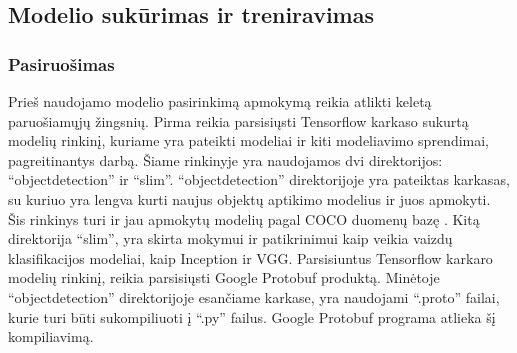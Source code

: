 \documentclass{VUMIFInfKursinis}
\begin{document}
\subsection{Modelio sukūrimas ir treniravimas}
\subsubsection{Pasiruošimas}
\par
Prieš naudojamo modelio pasirinkimą apmokymą reikia atlikti keletą
paruošiamųjų žingsnių.
Pirma reikia parsisiųsti Tensorflow karkaso sukurtą modelių rinkinį, kuriame
yra pateikti modeliai ir kiti modeliavimo sprendimai, pagreitinantys darbą.
Šiame rinkinyje yra naudojamos dvi direktorijos: \enquote{object\textunderscore detection} ir \enquote{slim}.
\enquote{object\textunderscore detection} direktorijoje yra pateiktas karkasas, su kuriuo yra lengva
kurti naujus objektų aptikimo modelius ir juos apmokyti. Šis rinkinys turi ir
jau apmokytų modelių pagal COCO duomenų bazę \cite{salt21}. Kitą direktorija \enquote{slim},
yra skirta mokymui ir patikrinimui kaip veikia vaizdų klasifikacijos
modeliai, kaip Inception ir VGG. Parsisiuntus Tensorflow karkaro modelių
rinkinį, reikia parsisiųsti Google Protobuf produktą. Minėtoje \enquote{object\textunderscore detection}
direktorijoje esančiame karkase, yra naudojami \enquote{.proto} failai, kurie turi būti
sukompiliuoti į \enquote{.py} failus. Google Protobuf programa atlieka šį kompiliavimą.
\end{document}

